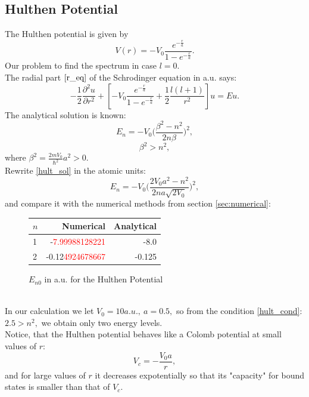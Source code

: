 \documentclass[a4paper, 12pt]{article}
\begin{document}
\subsection{Hulthen Potential}
The Hulthen potential is given by
\begin{equation}
V(r) = - V_0 \frac{e^{-\frac{r}{a}}}{1 - e^{-\frac{r}{a}}}.
\end{equation}
Our problem to find the spectrum in case $l=0.$\\
The radial part $\eqref{r_eq}$ of the Schrodinger equation in a.u.  says:
$$-\frac{1}{2}\frac{\partial^2 u}{\partial r^2}+[- V_0 \frac{e^{-\frac{r}{a}}}{1 - e^{-\frac{r}{a}}} +\frac{1}{2}\frac{l(l+1)}{r^2}]u = Eu.$$
The analytical solution is known:
\begin{equation}\label{hult_sol}
E_n = -V_0\bigg(\frac{\beta^2 - n^2}{2n\beta}\bigg)^2,
\end{equation}
\begin{equation}\label{hult_cond}
\beta^2 > n^2, 
\end{equation}
where $\beta^2 = \displaystyle{\frac{2m V_0}{\hbar^2}a^2} > 0.$\\
Rewrite \eqref{hult_sol} in the atomic units:
$$E_n = -V_0\bigg(\frac{2 V_0 a^2 - n^2}{2n a \sqrt{2V_0}}\bigg)^2,$$
and compare it with the numerical methods from section  \ref{sec:numerical}:
\begin{figure}
	\centering
	\begin{tabular}{lrr}
		\toprule
		\centering
		$n$ &         Numerical &         Analytical \\
		\midrule
		1 & -\textcolor{red}{7.99988128221} & -8.0 \\
		2 & -0.12\textcolor{red}{4924678667} & -0.125 \\
		\bottomrule
	\end{tabular}
	\caption{$E_{n0}$ in a.u. for the Hulthen Potential}
\end{figure}\\
In our calculation we let $V_0 = 10 a.u.,~a = 0.5,$ so from the condition \ref{hult_cond}: $2.5 > n^2,$ we obtain only two energy levels.\\
Notice, that the Hulthen potential behaves like  a Colomb potential at small values of $r:$
$$V_c = -\frac{V_0 a}{r},$$
and for large values of $r$ it decreases expotentially so that its "capacity" for bound states is smaller than that of $V_c.$
\end{document}
